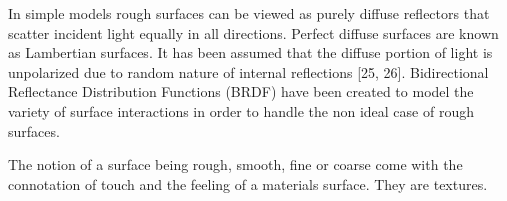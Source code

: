 In simple models rough surfaces can be viewed as purely diffuse reflectors that scatter incident light equally in all directions.  Perfect diffuse surfaces are known as Lambertian surfaces.  It has been assumed that the diffuse portion of light is unpolarized due to random nature of internal reflections [25, 26]. Bidirectional Reflectance Distribution Functions (BRDF) have been created to model the variety of surface interactions in order to handle the non ideal case of rough surfaces.

The notion of a surface being rough, smooth, fine or coarse come with the connotation of touch and the feeling of a materials surface.  They are textures.
